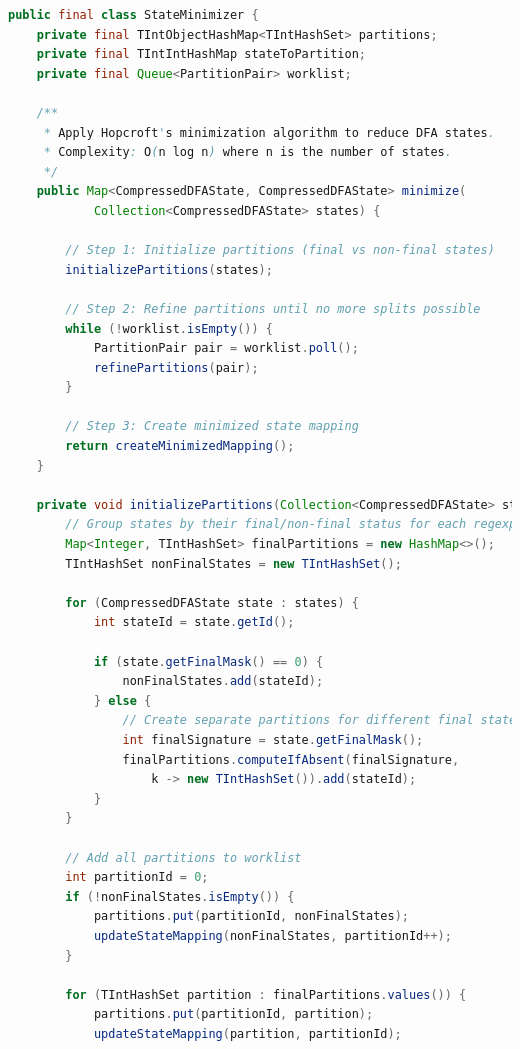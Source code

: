 \documentclass[11pt,a4paper]{article}
\begin{document}
\begin{lstlisting}[language=Java,caption={State Minimization Implementation}]
public final class StateMinimizer {
    private final TIntObjectHashMap<TIntHashSet> partitions;
    private final TIntIntHashMap stateToPartition;
    private final Queue<PartitionPair> worklist;
    
    /**
     * Apply Hopcroft's minimization algorithm to reduce DFA states.
     * Complexity: O(n log n) where n is the number of states.
     */
    public Map<CompressedDFAState, CompressedDFAState> minimize(
            Collection<CompressedDFAState> states) {
        
        // Step 1: Initialize partitions (final vs non-final states)
        initializePartitions(states);
        
        // Step 2: Refine partitions until no more splits possible
        while (!worklist.isEmpty()) {
            PartitionPair pair = worklist.poll();
            refinePartitions(pair);
        }
        
        // Step 3: Create minimized state mapping
        return createMinimizedMapping();
    }
    
    private void initializePartitions(Collection<CompressedDFAState> states) {
        // Group states by their final/non-final status for each regexp
        Map<Integer, TIntHashSet> finalPartitions = new HashMap<>();
        TIntHashSet nonFinalStates = new TIntHashSet();
        
        for (CompressedDFAState state : states) {
            int stateId = state.getId();
            
            if (state.getFinalMask() == 0) {
                nonFinalStates.add(stateId);
            } else {
                // Create separate partitions for different final state patterns
                int finalSignature = state.getFinalMask();
                finalPartitions.computeIfAbsent(finalSignature, 
                    k -> new TIntHashSet()).add(stateId);
            }
        }
        
        // Add all partitions to worklist
        int partitionId = 0;
        if (!nonFinalStates.isEmpty()) {
            partitions.put(partitionId, nonFinalStates);
            updateStateMapping(nonFinalStates, partitionId++);
        }
        
        for (TIntHashSet partition : finalPartitions.values()) {
            partitions.put(partitionId, partition);
            updateStateMapping(partition, partitionId);
            

\end{lstlisting}
\end{document}
